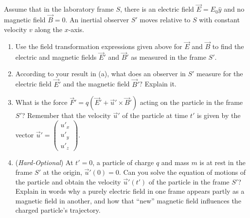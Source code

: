 \documentclass[12pt]{article}
\begin{document}
\begin{enumerate}
\noindent
Assume that in the laboratory frame $S$, there is an electric field $\vec{E} = E_0 \hat{y}$ and no magnetic field $\vec{B} = 0$. An inertial observer $S'$ moves relative to $S$ with constant velocity $v$ along the $x$-axis.
\begin{enumerate}
    \item[(a)] Use the field transformation expressions given above for $\vec{E}$ and $\vec{B}$ to find the electric and magnetic fields $\vec{E}'$ and $\vec{B}'$ as measured in the frame $S'$.
    \item[(b)] According to your result in (a), what does an observer in $S'$ measure for the electric field $\vec{E}'$ and the magnetic field $\vec{B}'$? Explain it.
\item[(c)] What is the force $\vec{F}'=q\left(\vec{E}' + \vec{u}'\times \vec{B}'\right)$ acting on the particle in the frame $S'$? Remember that the velocity $\vec{u}'$ of the particle at time $t'$ is given by the vector $\vec{u}'=\begin{pmatrix}
u'_x \\ u'_y \\ u'_z
\end{pmatrix}$.
    \item[(d)] (\textit{Hard-Optional}) At $t'=0$, a particle of charge $q$ and mass $m$ is at rest in the frame $S'$ at the origin, $\vec{u}'(0)=0$. Can you solve the equation of motions of the particle and obtain the velocity $\vec{u}'(t')$ of the particle in the frame $S'$? Explain in words why a purely electric field in one frame appears partly as a magnetic field in another, and how that “new” magnetic field influences the charged particle’s trajectory.

\end{enumerate}

\end{enumerate}
\end{document}
